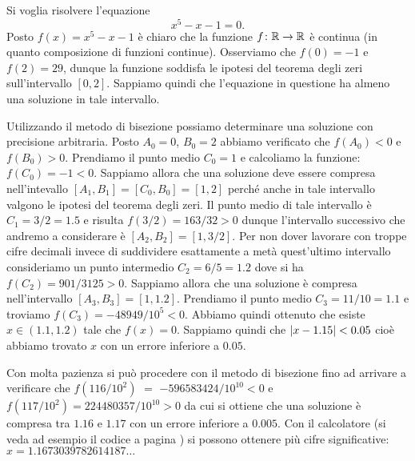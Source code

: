 \begin{example}\label{ex:75445}
Si voglia risolvere l'equazione
\[
  x^5-x-1=0.
\]
Posto $f(x) = x^5-x-1$ è chiaro che la funzione $f\colon \mathbb R\to \mathbb R$
è continua (in quanto composizione di funzioni continue).
Osserviamo che $f(0) = -1$ e $f(2)=29$, dunque la funzione
soddisfa le ipotesi del teorema degli zeri sull'intervallo $[0,2]$.
Sappiamo quindi che l'equazione in questione ha almeno una soluzione
in tale intervallo.

Utilizzando il metodo di bisezione possiamo determinare una soluzione
con precisione arbitraria. Posto $A_0=0$, $B_0=2$ abbiamo verificato che
$f(A_0)<0$ e $f(B_0)>0$.
Prendiamo il punto
medio $C_0=1$ e calcoliamo la funzione: $f(C_0)=-1 < 0$. Sappiamo
allora che una soluzione deve essere compresa nell'intevallo
$[A_1,B_1] = [C_0,B_0] = [1,2]$ perché anche in tale intervallo valgono le ipotesi
del teorema degli zeri.
Il punto medio di tale intervallo è $C_1=3/2 = 1.5$
e risulta $f(3/2) = 163/32>0$ dunque l'intervallo successivo
che andremo a considerare è $[A_2,B_2]=[1,3/2]$.
Per non dover lavorare con troppe cifre decimali invece di suddividere
esattamente a metà quest'ultimo intervallo consideriamo un punto
intermedio $C_2 = 6/5 = 1.2$ dove si ha $f(C_2)=901/3125>0$.
Sappiamo allora che una soluzione è compresa nell'intervallo
$[A_3,B_3] = [1,1.2]$. Prendiamo il punto medio $C_3=11/10=1.1$
e troviamo $f(C_3) = -48949/10^5 <0$. Abbiamo quindi ottenuto
che esiste $x\in (1.1,1.2)$ tale che $f(x)=0$. Sappiamo quindi
che ${\left|x-1.15\right|} < 0.05$ cioè abbiamo trovato $x$ con un errore
inferiore a $0.05$.

Con molta pazienza si può procedere
con il metodo di bisezione fino ad arrivare a verificare
che $f(116/10^2)$ $=$ $-596583424/10^{10}<0$ e $f(117/10^2)=224480357/10^{10}>0$ da cui
si ottiene che una soluzione è compresa tra $1.16$ e $1.17$ con un errore
inferiore a $0.005$.
Con il calcolatore (si veda ad esempio il codice a pagina \pageref{code:bisection})
si possono ottenere più cifre significative: $x=1.1673039782614187\ldots$
\end{example}

